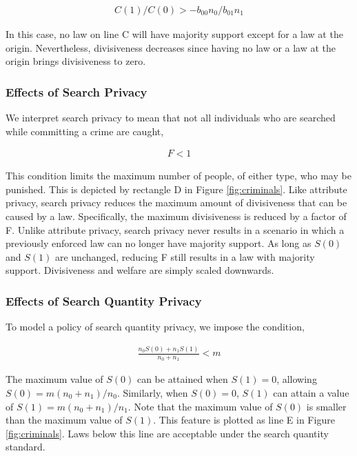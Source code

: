 \begin{align}
C(1)/C(0) > - b_{00}n_0 / b_{01}n_1 
\end{align}

In this case, no law on line C will have majority support except for a law at the origin.  Nevertheless, divisiveness decreases since having no law or a law at the origin brings divisiveness to zero.


\subsubsection{Effects of Search Privacy}

We interpret search privacy to mean that not all individuals who are searched while committing a crime are caught, 

\begin{align}
F<1
\end{align}

This condition limits the maximum number of people, of either type, who may be punished.  This is depicted by rectangle D in Figure \ref{fig:criminals}.  Like attribute privacy, search privacy reduces the maximum amount of divisiveness that can be caused by a law.  Specifically, the maximum divisiveness is reduced by a factor of F.  Unlike attribute privacy, search privacy never results in a scenario in which a previously enforced law can no longer have majority support.  As long as $S(0)$ and $S(1)$ are unchanged, reducing F still results in a law with majority support.  Divisiveness and welfare are simply scaled downwards.

\subsubsection{Effects of Search Quantity Privacy}

To model a policy of search quantity privacy, we impose the condition, 

\begin{align}
\frac{n_0 S(0) + n_1 S(1)}{n_0 + n_1}  < m
\end{align}

The maximum value of $S(0)$ can be attained when $S(1) = 0$, allowing $S(0) = m (n_0 + n_1)/n_0$.  Similarly, when $S(0) = 0$, $S(1)$ can attain a value of $S(1) = m (n_0 + n_1)/n_1$.   Note that the maximum value of $S(0)$ is smaller than the maximum value of $S(1)$.  This feature is plotted as line E in Figure \ref{fig:criminals}.  Laws below this line are acceptable under the search quantity standard.  

